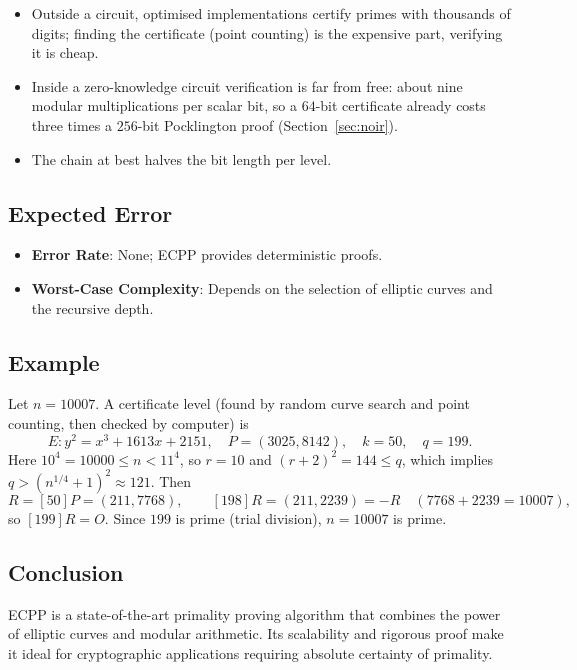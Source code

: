\documentclass[12pt]{article}
\begin{document}
\begin{itemize}
    \item Outside a circuit, optimised implementations certify primes with thousands of digits; finding the certificate (point counting) is the expensive part, verifying it is cheap.
    \item Inside a zero-knowledge circuit verification is far from free: about nine modular multiplications per scalar bit, so a $64$-bit certificate already costs three times a $256$-bit Pocklington proof (Section~\ref{sec:noir}).
    \item The chain at best halves the bit length per level.
\end{itemize}

\subsection*{Expected Error}

\begin{itemize}
    \item \textbf{Error Rate}: None; ECPP provides deterministic proofs.
    \item \textbf{Worst-Case Complexity}: Depends on the selection of elliptic curves and the recursive depth.
\end{itemize}

\subsection*{Example}

Let \( n = 10007 \). A certificate level (found by random curve search and point counting, then checked by computer) is
\[
E: y^2 = x^3 + 1613x + 2151, \quad P = (3025, 8142), \quad k = 50, \quad q = 199 .
\]
Here \( 10^4 = 10000 \le n < 11^4 \), so \( r = 10 \) and \( (r+2)^2 = 144 \le q \), which implies \( q > (n^{1/4}+1)^2 \approx 121 \). Then
\[
R = [50]P = (211, 7768), \qquad [198]R = (211, 2239) = -R \quad (7768 + 2239 = 10007),
\]
so \( [199]R = O \). Since \( 199 \) is prime (trial division), \( n = 10007 \) is prime.

\subsection*{Conclusion}

ECPP is a state-of-the-art primality proving algorithm that combines the power of elliptic curves and modular arithmetic. Its scalability and rigorous proof make it ideal for cryptographic applications requiring absolute certainty of primality.
\end{document}
